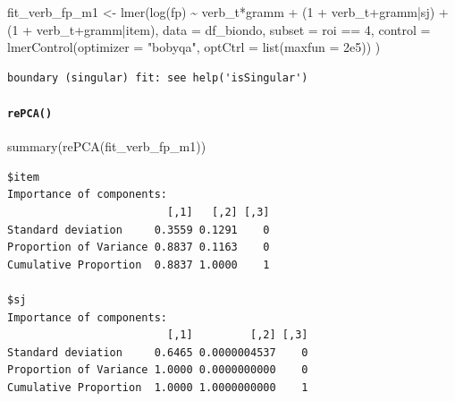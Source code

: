 \documentclass[
  letterpaper,
  DIV=11,
  numbers=noendperiod]{scrartcl}
\let\oldparagraph\paragraph
\renewcommand{\paragraph}[1]{\oldparagraph{#1}\mbox{}}
\newenvironment{Shaded}{\begin{snugshade}}{\end{snugshade}}
\newcommand{\AttributeTok}[1]{\textcolor[rgb]{0.40,0.45,0.13}{#1}}
\newcommand{\DecValTok}[1]{\textcolor[rgb]{0.68,0.00,0.00}{#1}}
\newcommand{\FloatTok}[1]{\textcolor[rgb]{0.68,0.00,0.00}{#1}}
\newcommand{\FunctionTok}[1]{\textcolor[rgb]{0.28,0.35,0.67}{#1}}
\newcommand{\NormalTok}[1]{\textcolor[rgb]{0.00,0.23,0.31}{#1}}
\newcommand{\OtherTok}[1]{\textcolor[rgb]{0.00,0.23,0.31}{#1}}
\newcommand{\SpecialCharTok}[1]{\textcolor[rgb]{0.37,0.37,0.37}{#1}}
\newcommand{\StringTok}[1]{\textcolor[rgb]{0.13,0.47,0.30}{#1}}
\begin{document}
\begin{Shaded}
\begin{Highlighting}[]
\NormalTok{fit\_verb\_fp\_m1 }\OtherTok{\textless{}{-}} \FunctionTok{lmer}\NormalTok{(}\FunctionTok{log}\NormalTok{(fp) }\SpecialCharTok{\textasciitilde{}}\NormalTok{ verb\_t}\SpecialCharTok{*}\NormalTok{gramm }\SpecialCharTok{+} 
\NormalTok{                      (}\DecValTok{1} \SpecialCharTok{+}\NormalTok{ verb\_t}\SpecialCharTok{+}\NormalTok{gramm}\SpecialCharTok{|}\NormalTok{sj) }\SpecialCharTok{+}
\NormalTok{                      (}\DecValTok{1} \SpecialCharTok{+}\NormalTok{ verb\_t}\SpecialCharTok{+}\NormalTok{gramm}\SpecialCharTok{|}\NormalTok{item),}
                    \AttributeTok{data =}\NormalTok{ df\_biondo,}
                    \AttributeTok{subset =}\NormalTok{ roi }\SpecialCharTok{==} \DecValTok{4}\NormalTok{,}
                    \AttributeTok{control =} \FunctionTok{lmerControl}\NormalTok{(}\AttributeTok{optimizer =} \StringTok{"bobyqa"}\NormalTok{,}
                                          \AttributeTok{optCtrl =} \FunctionTok{list}\NormalTok{(}\AttributeTok{maxfun =} \FloatTok{2e5}\NormalTok{))}
\NormalTok{)}
\end{Highlighting}
\end{Shaded}

\begin{verbatim}
boundary (singular) fit: see help('isSingular')
\end{verbatim}

\hypertarget{repca}{%
\paragraph{\texorpdfstring{\texttt{rePCA()}}{rePCA()}}\label{repca}}

\begin{Shaded}
\begin{Highlighting}[]
\FunctionTok{summary}\NormalTok{(}\FunctionTok{rePCA}\NormalTok{(fit\_verb\_fp\_m1))}
\end{Highlighting}
\end{Shaded}

\begin{verbatim}
$item
Importance of components:
                         [,1]   [,2] [,3]
Standard deviation     0.3559 0.1291    0
Proportion of Variance 0.8837 0.1163    0
Cumulative Proportion  0.8837 1.0000    1

$sj
Importance of components:
                         [,1]         [,2] [,3]
Standard deviation     0.6465 0.0000004537    0
Proportion of Variance 1.0000 0.0000000000    0
Cumulative Proportion  1.0000 1.0000000000    1
\end{verbatim}
\end{document}
